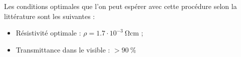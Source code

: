 \documentclass[twoside,a4paper,11pt,addpoints,answers]{exam}%
\begin{document}
Les conditions optimales que l'on peut espérer avec cette procédure selon la littérature sont les suivantes : 
\begin{itemize}
\item Résistivité optimale : $\rho = 1.7 \cdot 10^{-3} ~ \si{\ohm\centi\meter}$ ;
\item Transmittance dans le visible : $> 90 ~ \si{\percent}$
\end{itemize}

\end{document}
